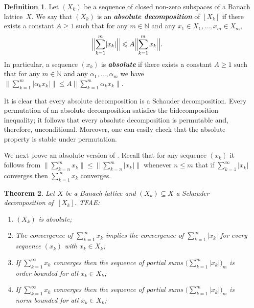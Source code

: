 \documentclass[12pt]{amsart}
\theoremstyle{plain}
\newtheorem{theorem}{Theorem}[section]
\theoremstyle{definition}
\newtheorem{definition}[theorem]{Definition}
\newcommand{\abs}[1]{\lvert#1\rvert}
\newcommand{\bignorm}[1]{\bigl\lVert#1\bigr\rVert}
\newcommand{\Bignorm}[1]{\Bigl\lVert#1\Bigr\rVert}
\newcommand{\term}[1]{{\textit{\textbf{#1}}}}   %
\renewcommand{\le}{\leqslant}
\renewcommand{\ge}{\geqslant}
\begin{document}
\begin{definition}
  Let $(X_k)$ be a sequence of closed non-zero subspaces of a Banach
  lattice~$X$. We say that $(X_k)$ is an \term{absolute decomposition}
  of $[X_k]$ if there exists a constant $A\ge 1$ such that for any
  $m\in \mathbb{N}$ and any $x_1\in X_1,\dots,x_m\in X_m$,
 \begin{equation}\label{abs-ineq}
   \Bignorm{\sum_{k=1}^m\abs{x_k}}
   \le A\Bignorm{\sum_{k=1}^mx_k}.
 \end{equation}
 In particular, a sequence $(x_k)$ is \term{absolute} if there exists a
 constant $A\ge 1$ such that for any $m\in\mathbb N$ and any
 $\alpha_1,\dots,\alpha_m$ we have
 \begin{math}
   \bignorm{\sum_{k=1}^m\abs{\alpha_k x_k}}
   \le A\bignorm{\sum_{k=1}^m\alpha_k x_k}.
 \end{math}
\end{definition}

It is clear that every absolute decomposition is a Schauder
decomposition. Every permutation of an absolute decomposition
satisfies the bidecomposition inequality; it follows that every
absolute decomposition is permutable and, therefore, unconditional.
Moreover, one can easily check that the absolute property is stable
under permutation.

We next prove an absolute version of . Recall that for
any sequence $(x_k)$ it follows from
\begin{math}
  \bignorm{\sum_{k=n}^mx_k}\le\bignorm{\sum_{k=n}^m\abs{x_k}}
\end{math}
whenever $n\le m$ that if $\sum_{k=1}^\infty\abs{x_k}$ converges then
$\sum_{k=1}^\infty x_k$ converges. 

\begin{theorem}\label{abs}
  Let $X$ be a Banach lattice and $(X_k)\subseteq X$ a Schauder
  decomposition of~$[X_k]$. TFAE:
  \begin{enumerate}
  \item\label{abs-const} $(X_k)$ is absolute;
  \item\label{abs-abs} The convergence of $\sum_{k=1}^\infty x_k$
    implies the convergence of $\sum_{k=1}^\infty\abs{x_k}$ for every
    sequence $(x_k)$ with $x_k\in X_k$;
  \item\label{abs-obdd} If $\sum_{k=1}^\infty x_k$ converges then
    the sequence of partial sums
    $\bigl(\sum_{k=1}^m\abs{x_k}\bigr)_m$ is order bounded for all
    $x_k\in X_k$;
  \item\label{abs-norm-bdd} If $\sum_{k=1}^\infty x_k$ converges then
    the sequence of partial sums
    $\bigl(\sum_{k=1}^m\abs{x_k}\bigr)_m$ is norm bounded for all
    $x_k\in X_k$;
  \end{enumerate}
\end{theorem}
\end{document}
